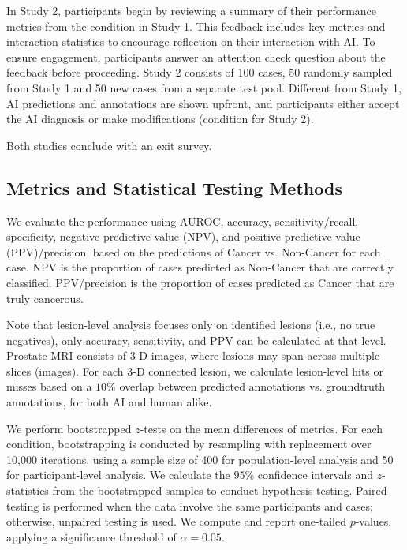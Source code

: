 In Study 2, participants begin by reviewing a summary of their performance metrics from the \hai condition in Study 1. This feedback includes key metrics and interaction statistics to encourage reflection on their interaction with AI. To ensure engagement, participants answer an attention check question about the feedback before proceeding.
Study 2 consists of 100 cases, 50 randomly sampled from Study 1 and 50 new cases from a separate test pool.
Different from Study 1, AI predictions and annotations are shown upfront, and participants either accept the AI diagnosis or make modifications (\hai condition for Study 2).

Both studies conclude with an exit survey.



\subsection{Metrics and Statistical Testing Methods}

We evaluate the performance using AUROC, accuracy, sensitivity/recall, specificity, negative predictive value (NPV), and positive predictive value (PPV)/precision, based on the predictions of Cancer vs. Non-Cancer for each case.
NPV is the proportion of cases predicted as Non-Cancer that are correctly classified. PPV/precision is the proportion of cases predicted as Cancer that are truly cancerous.

Note that lesion-level analysis focuses only on identified lesions (i.e., no true negatives), only accuracy, sensitivity, and PPV can be calculated at that level.
Prostate MRI consists of 3-D images, where lesions may span across multiple slices (images). For each 3-D connected lesion, we calculate lesion-level hits or misses based on a $10\%$ overlap between predicted annotations vs. groundtruth annotations, for both AI and human alike. 

We perform bootstrapped $z$-tests on the mean differences of metrics.
For each condition, bootstrapping is conducted by resampling with replacement over 10,000 iterations, using a sample size of 400 for population-level analysis and 50 for participant-level analysis.
We calculate the $95\%$ confidence intervals and $z$-statistics from the bootstrapped samples to conduct hypothesis testing.
Paired testing is performed when the data involve the same participants and cases; otherwise, unpaired testing is used.
We compute and report one-tailed $p$-values, applying a significance threshold of $\alpha=0.05$.

